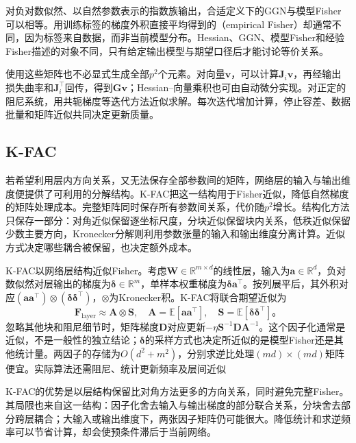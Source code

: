 对负对数似然、以自然参数表示的指数族输出，合适定义下的GGN与模型Fisher可以相等。用训练标签的梯度外积直接平均得到的（empirical Fisher）却通常不同，因为标签来自数据，而非当前模型分布。Hessian、GGN、模型Fisher和经验Fisher描述的对象不同，只有给定输出模型与期望口径后才能讨论等价关系。

使用这些矩阵也不必显式生成全部$p^2$个元素。对向量$\bm v$，可以计算$\bm J_i\bm v$，再经输出损失曲率和$\bm J_i^{\top}$回传，得到$\bm G\bm v$；Hessian--向量乘积也可由自动微分实现。对正定的阻尼系统，用共轭梯度等迭代方法近似求解。每次迭代增加计算，停止容差、数据批量和矩阵近似共同决定更新质量。

\subsection{K-FAC}
\label{sec:training-structured-preconditioning}

若希望利用层内方向关系，又无法保存全部参数间的矩阵，网络层的输入与输出维度便提供了可利用的分解结构。K-FAC把这一结构用于Fisher近似，降低自然梯度的矩阵处理成本。完整矩阵同时保存所有参数间关系，代价随$p^2$增长。结构化方法只保存一部分：对角近似保留逐坐标尺度，分块近似保留块内关系，低秩近似保留少数主要方向，Kronecker分解则利用参数张量的输入和输出维度分离计算。近似方式决定哪些耦合被保留，也决定额外成本。

K-FAC以网络层结构近似Fisher。考虑$\bm W\in\mathbb R^{m\times d}$的线性层，输入为$\bm a\in\mathbb R^d$，负对数似然对层输出的梯度为$\bm\delta\in\mathbb R^m$，单样本权重梯度为$\bm\delta\bm a^{\top}$。按列展平后，其外积对应$(\bm a\bm a^{\top})\otimes(\bm\delta\bm\delta^{\top})$，$\otimes$为Kronecker积。K-FAC将联合期望近似为
\begin{equation}
  \bm F_{\mathrm{layer}}\approx\bm A\otimes\bm S,
  \quad\bm A=\mathbb E[\bm a\bm a^{\top}],\quad
  \bm S=\mathbb E[\bm\delta\bm\delta^{\top}]\text{。}
  \label{eq:training-kfac}
\end{equation}
忽略其他块和阻尼细节时，矩阵梯度$\bm D$对应更新$-\eta\bm S^{-1}\bm D\bm A^{-1}$。这个因子化通常是近似，不是一般性的独立结论；$\bm\delta$的采样方式也决定所近似的是模型Fisher还是其他统计量。两因子的存储为$O(d^2+m^2)$，分别求逆比处理$(md)\times(md)$矩阵便宜。实际算法还需阻尼、统计更新频率及层间近似

K-FAC的优势是以层结构保留比对角方法更多的方向关系，同时避免完整Fisher。其局限也来自这一结构：因子化舍去输入与输出梯度的部分联合关系，分块舍去部分跨层耦合；大输入或输出维度下，两张因子矩阵仍可能很大。降低统计和求逆频率可以节省计算，却会使预条件滞后于当前网络。

